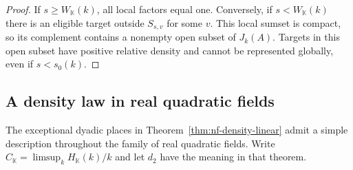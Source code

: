 \documentclass[11pt,letterpaper]{article}
\theoremstyle{definition}
\numberwithin{equation}{section}
\begin{document}
\begin{proof}
If $s\ge W_{\mathbb K}(k)$, all local factors equal one.
Conversely, if $s<W_{\mathbb K}(k)$ there is an eligible target
outside $S_{s,v}$ for some $v$. This local sumset is compact, so
its complement contains a nonempty open subset of $J_k(A)$.
Targets in this open subset have positive relative density and
cannot be represented globally, even if $s<s_0(k)$.
\end{proof}

\subsection{A density law in real quadratic fields}
\label{sec:quadratic-density}
The exceptional dyadic places in Theorem~\ref{thm:nf-density-linear}
admit a simple description throughout the family of real quadratic
fields. Write $C_{\mathbb K}=\limsup_k H_{\mathbb K}(k)/k$ and let
$d_2$ have the meaning in that theorem.
\end{document}
